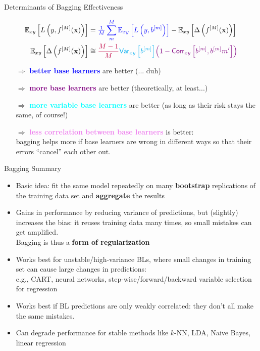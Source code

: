 \documentclass[11pt,compress,t,notes=noshow, xcolor=table]{beamer}
\begin{document}
\begin{vbframe}{Determinants of Bagging Effectiveness}
\begin{small}
\begin{align*}
\mathbb{E}_{xy}\left[L\left(y, f^{[M]}(\mathbf{x})\right)\right] &= \textcolor{blue}{\tfrac{1}{M}\sum^M_{m} \mathbb{E}_{xy}\left[L\left(y, b^{[m]} \right)\right]} - \mathbb{E}_{xy}\left[\Delta\left(f^{[M]}(\mathbf{x})\right)\right]\\
\mathbb{E}_{xy}\left[\Delta\left(f^{[M]}(\mathbf{x})\right)\right] &\cong 
\textcolor{purple}{\frac{M-1}{M}} \textcolor{cyan}{\mathsf{Var}_{xy}\left[b^{[m]}\right]} \textcolor{violet}{\left(1 - \mathsf{Corr}_{xy}\left[b^{[m]}, b^{[m]}{m'}\right]\right)}
\end{align*}
\end{small}
\begin{itemize}
\item[$\Rightarrow$] \textcolor{blue}{\textbf{better base learners}} are better {\small (... duh)}
\item[$\Rightarrow$] \textcolor{purple}{\textbf{more base learners}} are better {\small (theoretically, at least...)}\\
\item[$\Rightarrow$] \textcolor{cyan}{\textbf{more variable base learners}} are better {\small(as long as their risk stays the same, of course!)}
\item[$\Rightarrow$] \textcolor{violet}{\textbf{less correlation between base learners}} is better:\\ bagging helps more if base learners are wrong in different ways so that their errors \enquote{cancel} each other out.\\
\end{itemize}


\end{vbframe}

\begin{vbframe}{Bagging Summary}

  \begin{itemize}
    \item Basic idea: fit the same model repeatedly on many \textbf{bootstrap} replications of the training data set and \textbf{aggregate} the results
    \item Gains in performance by reducing variance of predictions, but (slightly) increases the bias: it reuses training data many times, so small mistakes can get amplified.\\ Bagging is thus a \textbf{form of regularization}
    \item Works best for unstable/high-variance BLs, where small changes in training set can cause large changes in predictions:\\
    e.g., CART, neural networks, step-wise/forward/backward variable selection for regression\\
    \item Works best if BL predictions are only weakly correlated: they don't all make the same mistakes.
    \item Can degrade performance for stable methods like $k$-NN, LDA, Naive Bayes, linear regression
  \end{itemize}
\end{vbframe}



\endlecture
\end{document}
